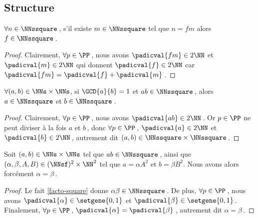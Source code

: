 \subsection{Structure}


\begin{fact} \label{facto-square}
	$\forall n \in \NNssquare$\,, s'il existe $m \in \NNssquare$ tel que $n =  f m$ alors $f  \in \NNssquare$\,.
\end{fact}


\begin{proof}
	Clairement, $\forall p \in \PP$\,, nous avons 
	$\padicval{f m} \in 2 \NN$
	et
	$\padicval{m} \in 2 \NN$
	qui donnent
	$\padicval{f} \in 2 \NN$
	car $\padicval{f m} = \padicval{f} + \padicval{m}$\,.
\end{proof}




\begin{fact} \label{prime-square}
	$\forall (a, b) \in \NNs \times \NNs$, 
	si $\GCD{a}{b} = 1$ et $a b \in \NNssquare$\,,
	alors $a \in \NNssquare$ et $b \in \NNssquare$\,.
\end{fact}


\begin{proof}
	Clairement, $\forall p \in \PP$\,, nous avons $\padicval{ab} \in 2 \NN$\,.
    Or $p \in \PP$ ne peut diviser à la fois $a$ et $b$\,, donc
    $\forall p \in \PP$\,, 
    $\padicval{a} \in 2 \NN$ et $\padicval{b} \in 2 \NN$\,,
    autrement dit 
    $(a, b) \in \NNssquare \times \NNssquare$\,.
\end{proof}




\begin{fact} \label{same-square-free}
	Soit $(a, b) \in \NNs \times \NNs$ tel que $a b \in \NNssquare$\,,
	ainsi que $(\alpha, \beta, A, B) \in ( \NNsf )^2 \times \NN^2$ tel que $a = \alpha A^2$ et $b = \beta B^2$.
	Nous avons alors forcément $\alpha = \beta$\,.
\end{fact}


\begin{proof}
	Le fait \ref{facto-square} donne $\alpha \beta \in \NNssquare$\,.
	De plus, $\forall p \in \PP$\,, nous avons 
	$\padicval{\alpha} \in \setgene{0, 1}$
	et
	$\padicval{\beta} \in \setgene{0, 1}$\,.
	Finalement, $\forall p \in \PP$\,, $\padicval{\alpha} = \padicval{\beta}$\,, autrement dit $\alpha = \beta$\,.
\end{proof}




